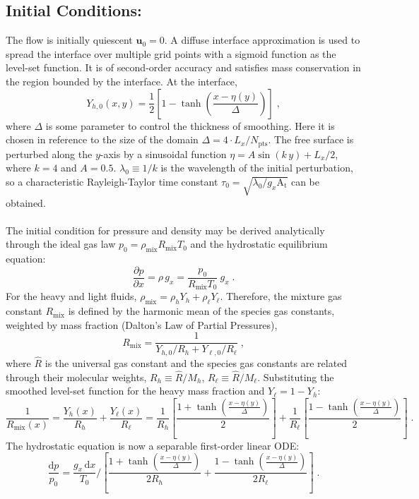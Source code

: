 \documentclass{homework}
\begin{document}
\subsection*{Initial Conditions: \qquad}
The flow is initially quiescent $\mathbf{u}_0 = 0$. A diffuse interface approximation is used to spread the interface over multiple grid points with a sigmoid function as the level-set function. It is of second-order accuracy and satisfies mass conservation in the region bounded by the interface. At the interface,
$$Y_{h,0} (x,y) =\frac{1}{2}\left[1-\tanh{\left(\frac{x - \eta(y) }{\Delta}\right)}\right] \; ,$$
where $\Delta$ is some parameter to control the thickness of smoothing. Here it is chosen in reference to the size of the domain $\Delta = 4 \cdot L_{x} / N_\mathrm{pts}$. The free surface is perturbed along the $y$-axis by a sinusoidal function $\eta = A \sin{\left(k \, y \right) + L_x/2}$,  where $k=4$ and $A = 0.5$. $\lambda_0 \equiv 1/k$ is the wavelength of the initial perturbation, so a characteristic Rayleigh-Taylor time constant $\tau_0 = \sqrt{\lambda_0 / g_x \mathrm{A_t}}$ can be obtained.
\\ \\
The initial condition for pressure and density may be derived analytically through the ideal gas law $p_0 = \rho_\mathrm{mix} R_\mathrm{mix} T_0$ and the hydrostatic equilibrium equation:
$$\frac{ \partial p}{ \partial x} = \rho \, g_x =\frac{p_0}{R_{\mathrm{mix}} T_0}\ g_x  \; .$$
For the heavy and light fluids, $\rho_\mathrm{mix}= \rho_h Y_h + \rho_\ell Y_\ell$. Therefore, the mixture gas constant $R_\mathrm{mix}$ is defined by the harmonic mean of the species gas constants, weighted by mass fraction (Dalton's Law of Partial Pressures),
$$R_{\mathrm{mix}}=\frac{1}{Y_{h,0}/R_h+Y_{\ell,0}/R_\ell} \; ,$$
where $\hat{R}$ is the universal gas constant and the species gas constants are related through their molecular weights, $R_h \equiv \hat{R}/M_h$, $R_\ell \equiv \hat{R}/M_\ell$. Substituting the smoothed level-set function for the heavy mass fraction and $Y_\ell = 1 - Y_h$: 
$$\frac{1}{R_\mathrm{mix}(x)} = \frac{Y_h(x)}{R_h} + \frac{Y_\ell(x)}{R_\ell} = \frac{1}{R_h}\left[\frac{1 + \tanh(\frac{x- \eta(y)}{\Delta})}{2}\right] + \frac{1}{R_\ell}\left[\frac{1 - \tanh(\frac{x- \eta(y)}{\Delta})}{2}\right]  \; .$$
The hydrostatic equation is now a separable first-order linear ODE:
$$\frac{ \mathrm{d} p}{p_0} = \frac{g_x \, \mathrm{d} x}{T_0} / \left[ {\frac{1 + \tanh \left(\frac{x - \eta(y)}{\Delta} \right)}{ 2 R_h} + \frac{1 - \tanh \left(\frac{x - \eta(y)}{\Delta} \right)}{ 2 R_\ell}} \right] \; .$$
\end{document}
